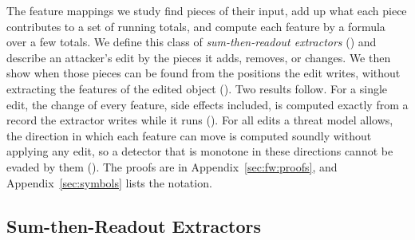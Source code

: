 
The feature mappings we study find pieces of their input, add up what each piece contributes to a set of running
totals, and compute each feature by a formula over a few totals. We define this class of \emph{sum-then-readout
extractors} () and describe an attacker's edit by the pieces it adds, removes, or changes. We then
show when those pieces can be found from the positions the edit writes, without extracting the features of the edited
object (). Two results follow. For a single edit, the change of every feature, side effects
included, is computed exactly from a record the extractor writes while it runs (). For all
edits a threat model allows, the direction in which each feature can move is computed soundly without applying any
edit, so a detector that is monotone in these directions cannot be evaded by them (). The
proofs are in Appendix~\ref{sec:fw:proofs}, and Appendix~\ref{sec:symbols} lists the notation.

\subsection{Sum-then-Readout Extractors}
\label{sec:fw:model}

